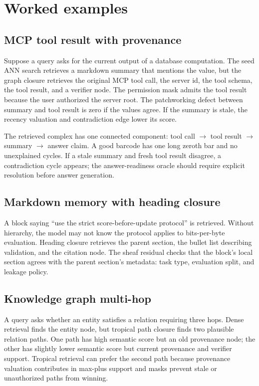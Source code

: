 \documentclass[11pt]{article}
\theoremstyle{definition}
\theoremstyle{remark}
\begin{document}
\section{Worked examples}

\subsection{MCP tool result with provenance}

Suppose a query asks for the current output of a database computation. The seed ANN search retrieves a markdown summary that mentions the value, but the graph closure retrieves the original MCP tool call, the server id, the tool schema, the tool result, and a verifier node. The permission mask admits the tool result because the user authorized the server root. The patchworking defect between summary and tool result is zero if the values agree. If the summary is stale, the recency valuation and contradiction edge lower its score.

The retrieved complex has one connected component: tool call \(\to\) tool result \(\to\) summary \(\to\) answer claim. A good barcode has one long zeroth bar and no unexplained cycles. If a stale summary and fresh tool result disagree, a contradiction cycle appears; the answer-readiness oracle should require explicit resolution before answer generation.

\subsection{Markdown memory with heading closure}

A block saying ``use the strict score-before-update protocol'' is retrieved. Without hierarchy, the model may not know the protocol applies to bits-per-byte evaluation. Heading closure retrieves the parent section, the bullet list describing validation, and the citation node. The sheaf residual checks that the block's local section agrees with the parent section's metadata: task type, evaluation split, and leakage policy.

\subsection{Knowledge graph multi-hop}

A query asks whether an entity satisfies a relation requiring three hops. Dense retrieval finds the entity node, but tropical path closure finds two plausible relation paths. One path has high semantic score but an old provenance node; the other has slightly lower semantic score but current provenance and verifier support. Tropical retrieval can prefer the second path because provenance valuation contributes in max-plus support and masks prevent stale or unauthorized paths from winning.
\end{document}
